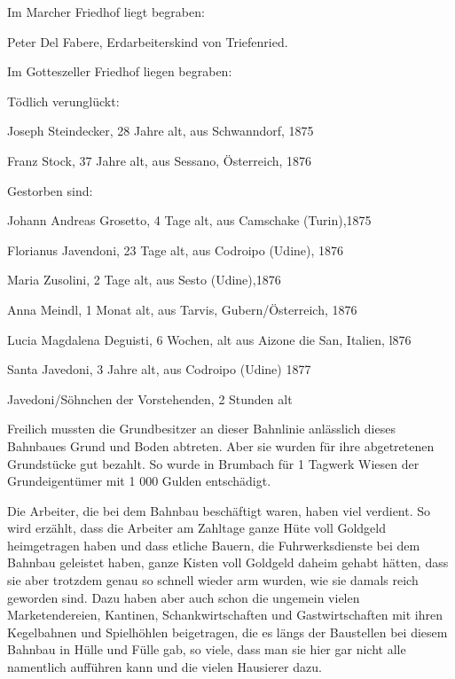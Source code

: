 \documentclass[12pt,a4pager]{book}
\begin{document}
Im Marcher Friedhof liegt begraben:

\begin{compactitem}
\item Peter Del Fabere, Erdarbeiterskind von Triefenried.
\end{compactitem}

Im Gotteszeller Friedhof liegen begraben:

Tödlich verunglückt:

\begin{compactitem}
\item Joseph Steindecker, 28 Jahre alt, aus Schwanndorf, 1875
\item Franz Stock, 37 Jahre alt, aus Sessano, Österreich, 1876
\end{compactitem}

Gestorben sind:

\begin{compactitem}
\item Johann Andreas Grosetto, 4 Tage alt, aus Camschake (Turin),1875
\item Florianus Javendoni, 23 Tage alt, aus Codroipo (Udine), 1876
\item Maria Zusolini, 2 Tage alt, aus Sesto (Udine),1876
\item Anna Meindl, 1 Monat alt, aus Tarvis, Gubern/Österreich, 1876
\item Lucia Magdalena Deguisti, 6 Wochen, alt aus Aizone die San, Italien, l876
\item Santa Javedoni, 3 Jahre alt, aus Codroipo (Udine) 1877
\item Javedoni/Söhnchen der Vorstehenden, 2 Stunden alt
\end{compactitem}

Freilich mussten die Grundbesitzer an dieser Bahnlinie anlässlich dieses
Bahnbaues Grund und Boden abtreten. Aber sie wurden für ihre abgetretenen
Grundstücke gut bezahlt. So wurde in Brumbach für 1 Tagwerk Wiesen der
Grundeigentümer mit 1 000 Gulden entschädigt.

Die Arbeiter, die bei dem Bahnbau beschäftigt waren, haben viel verdient. So
wird erzählt, dass die Arbeiter am Zahltage ganze Hüte voll Goldgeld
heimgetragen haben und dass etliche Bauern, die Fuhrwerksdienste bei dem Bahnbau
geleistet haben, ganze Kisten voll Goldgeld daheim gehabt hätten, dass sie aber
trotzdem genau so schnell wieder arm wurden, wie sie damals reich geworden sind.
Dazu haben aber auch schon die ungemein vielen Marketendereien, Kantinen,
Schankwirtschaften und Gastwirtschaften mit ihren Kegelbahnen und Spielhöhlen
beigetragen, die es längs der Baustellen bei diesem Bahnbau in Hülle und Fülle
gab, so viele, dass man sie hier gar nicht alle namentlich aufführen kann und
die vielen Hausierer dazu.
\end{document}
